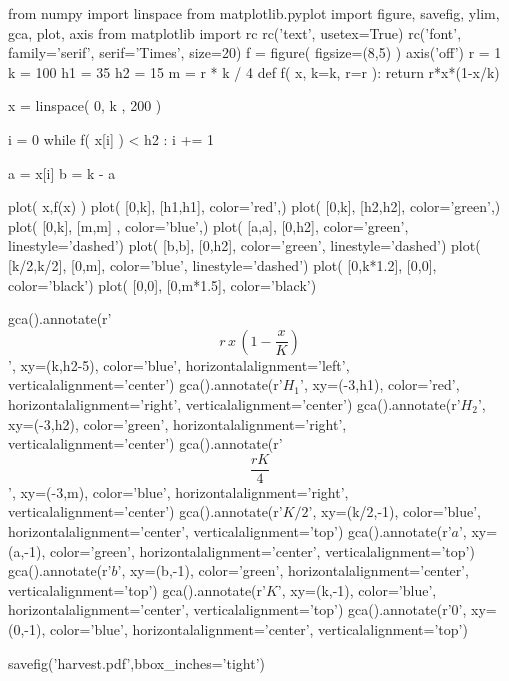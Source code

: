 \documentclass[12pt,twoside,a4paper]{article}
\begin{document}
\begin{pycode}
from numpy import linspace
from matplotlib.pyplot import figure, savefig, ylim, gca, plot, axis
from matplotlib import rc
rc('text', usetex=True)
rc('font', family='serif', serif='Times', size=20)
f = figure( figsize=(8,5) )
axis('off')
r = 1
k = 100
h1 = 35
h2 = 15
m = r * k / 4
def f( x, k=k, r=r ):
    return r*x*(1-x/k)

x   = linspace( 0, k , 200 )

i = 0
while f( x[i] ) < h2  : 
    i += 1
    
a = x[i]
b = k - a

plot( x,f(x) )
plot( [0,k], [h1,h1], color='red',)
plot( [0,k], [h2,h2], color='green',)
plot( [0,k], [m,m] ,  color='blue',)
plot( [a,a], [0,h2], color='green', linestyle='dashed')
plot( [b,b], [0,h2], color='green', linestyle='dashed')
plot( [k/2,k/2], [0,m], color='blue', linestyle='dashed')
plot(  [0,k*1.2], [0,0], color='black')
plot(  [0,0], [0,m*1.5], color='black')

gca().annotate(r'$$r\,x\,\left(1-\frac{x}{K}\right)$$', 
                    xy=(k,h2-5), 
                    color='blue', 
                    horizontalalignment='left',  
                    verticalalignment='center')
gca().annotate(r'$H_1$', 
                    xy=(-3,h1), 
                    color='red', 
                    horizontalalignment='right',  
                    verticalalignment='center')
gca().annotate(r'$H_2$', 
                    xy=(-3,h2), 
                    color='green', 
                    horizontalalignment='right',  
                    verticalalignment='center')
gca().annotate(r'$$\frac{rK}{4}$$', 
                    xy=(-3,m), 
                    color='blue', 
                    horizontalalignment='right',  
                    verticalalignment='center')
gca().annotate(r'$K/2$', 
                    xy=(k/2,-1), 
                    color='blue', 
                    horizontalalignment='center',  
                    verticalalignment='top')
gca().annotate(r'$a$', 
                    xy=(a,-1), 
                    color='green', 
                    horizontalalignment='center',  
                    verticalalignment='top')
gca().annotate(r'$b$', 
                    xy=(b,-1), 
                    color='green', 
                    horizontalalignment='center',  
                    verticalalignment='top')
gca().annotate(r'$K$', 
                    xy=(k,-1), 
                    color='blue', 
                    horizontalalignment='center',  
                    verticalalignment='top')
gca().annotate(r'$0$', 
                    xy=(0,-1), 
                    color='blue', 
                    horizontalalignment='center',  
                    verticalalignment='top')

savefig('harvest.pdf',bbox_inches='tight')
\end{pycode}
\end{document}
